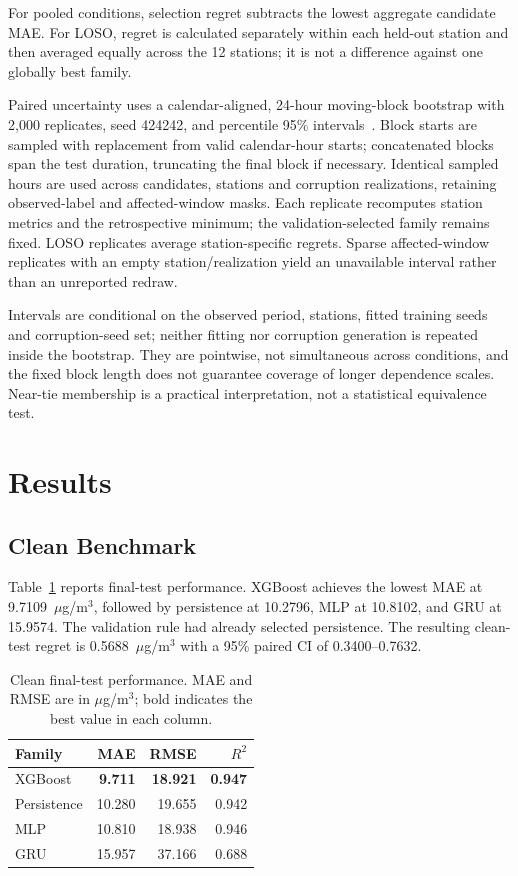 \documentclass[journal]{IEEEtran}
\begin{document}
For pooled conditions, selection regret subtracts the lowest aggregate candidate MAE. For LOSO, regret is calculated separately within each held-out station and then averaged equally across the 12 stations; it is not a difference against one globally best family.

Paired uncertainty uses a calendar-aligned, 24-hour moving-block bootstrap with 2,000 replicates, seed 424242, and percentile 95\% intervals~\cite{kuensch1989bootstrap}. Block starts are sampled with replacement from valid calendar-hour starts; concatenated blocks span the test duration, truncating the final block if necessary. Identical sampled hours are used across candidates, stations and corruption realizations, retaining observed-label and affected-window masks. Each replicate recomputes station metrics and the retrospective minimum; the validation-selected family remains fixed. LOSO replicates average station-specific regrets. Sparse affected-window replicates with an empty station/realization yield an unavailable interval rather than an unreported redraw.

Intervals are conditional on the observed period, stations, fitted training seeds and corruption-seed set; neither fitting nor corruption generation is repeated inside the bootstrap. They are pointwise, not simultaneous across conditions, and the fixed block length does not guarantee coverage of longer dependence scales. Near-tie membership is a practical interpretation, not a statistical equivalence test.



\section{Results}
\subsection{Clean Benchmark}
Table~\ref{tab:clean} reports final-test performance. XGBoost achieves the lowest MAE at 9.7109~$\mu$g/m$^3$, followed by persistence at 10.2796, MLP at 10.8102, and GRU at 15.9574. The validation rule had already selected persistence. The resulting clean-test regret is 0.5688~$\mu$g/m$^3$ with a 95\% paired CI of 0.3400--0.7632.

\begin{table}[t]
\centering
\caption{Clean final-test performance. MAE and RMSE are in $\mu$g/m$^3$; bold indicates the best value in each column.}
\label{tab:clean}
\begin{tabular}{lrrr}
\toprule
\textbf{Family} & \textbf{MAE} & \textbf{RMSE} & \textbf{$R^2$} \\
\midrule
XGBoost & \textbf{9.711} & \textbf{18.921} & \textbf{0.947} \\
Persistence & 10.280 & 19.655 & 0.942 \\
MLP & 10.810 & 18.938 & 0.946 \\
GRU & 15.957 & 37.166 & 0.688 \\
\bottomrule
\end{tabular}
\end{table}
\end{document}
